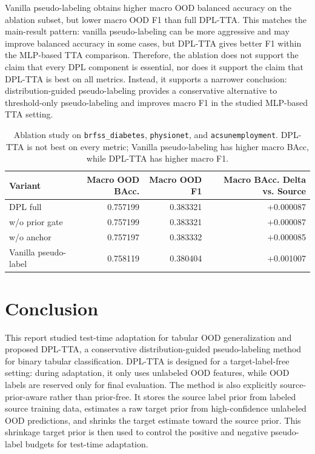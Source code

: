 Vanilla pseudo-labeling obtains higher macro OOD balanced accuracy on the ablation subset, but lower macro OOD F1 than full DPL-TTA. This matches the main-result pattern: vanilla pseudo-labeling can be more aggressive and may improve balanced accuracy in some cases, but DPL-TTA gives better F1 within the MLP-based TTA comparison. Therefore, the ablation does not support the claim that every DPL component is essential, nor does it support the claim that DPL-TTA is best on all metrics. Instead, it supports a narrower conclusion: distribution-guided pseudo-labeling provides a conservative alternative to threshold-only pseudo-labeling and improves macro F1 in the studied MLP-based TTA setting.

\begin{table}[t]
\centering
\caption{Ablation study on \texttt{brfss\_diabetes}, \texttt{physionet}, and \texttt{acsunemployment}. DPL-TTA is not best on every metric; Vanilla pseudo-labeling has higher macro BAcc, while DPL-TTA has higher macro F1.}
\label{tab:ablation}
\begin{tabular}{lrrr}
\toprule
Variant & Macro OOD BAcc. & Macro OOD F1 & Macro BAcc. Delta vs. Source \\
\midrule
DPL full             & 0.757199 & 0.383321 & +0.000087 \\
w/o prior gate       & 0.757199 & 0.383321 & +0.000087 \\
w/o anchor           & 0.757197 & 0.383332 & +0.000085 \\
Vanilla pseudo-label & 0.758119 & 0.380404 & +0.001007 \\
\bottomrule
\end{tabular}
\end{table}


\section{Conclusion}

This report studied test-time adaptation for tabular OOD generalization and proposed DPL-TTA, a conservative distribution-guided pseudo-labeling method for binary tabular classification. DPL-TTA is designed for a target-label-free setting: during adaptation, it only uses unlabeled OOD features, while OOD labels are reserved only for final evaluation. The method is also explicitly source-prior-aware rather than prior-free. It stores the source label prior from labeled source training data, estimates a raw target prior from high-confidence unlabeled OOD predictions, and shrinks the target estimate toward the source prior. This shrinkage target prior is then used to control the positive and negative pseudo-label budgets for test-time adaptation.

